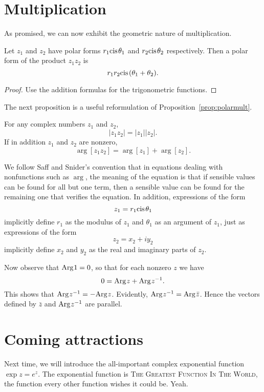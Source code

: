 \documentclass[twocolumn,12pt]{article}
\begin{document}
\section{Multiplication}
As promised, we can now exhibit the geometric nature of multiplication.
\begin{proposition} \label{prop:polarmult}
  Let $z_1$ and $z_2$ have polar forms $r_1 \cis{\theta_1}$ and $r_2 \cis{\theta_2}$ respectively. Then a polar form of the product $z_1 z_2$ is
  \[
    r_1 r_2 \cis{(\theta_1 + \theta_2)}.
  \]
\end{proposition}
\begin{proof}
  Use the addition formulas for the trigonometric functions.
\end{proof}
The next proposition is a useful reformulation of Proposition~\ref{prop:polarmult}. 
\begin{proposition}
  For any complex numbers $z_1$ and $z_2$,
  \[
    |z_1 z_2| = |z_1| |z_2|.
  \]
  If in addition $z_1$ and $z_2$ are nonzero,
  \[
    \arg[z_1 z_2] = \arg[z_1] + \arg[z_2].
  \]
\end{proposition}
We follow Saff and Snider's convention that in equations dealing with nonfunctions such as $\arg$, the meaning of the equation is that if sensible values can be found for all but one term, then a sensible value can be found for the remaining one that verifies the equation. In addition, expressions of the form
\[
  z_1 = r_1 \cis{\theta_1}
\]
implicitly define $r_1$ as the modulus of $z_1$ and $\theta_1$ as an argument of $z_1$, just as expressions of the form
\[
  z_2 = x_2 + i y_2
\]
implicitly define $x_2$ and $y_2$ as the real and imaginary parts of $z_2$.

Now observe that $\Arg[1] = 0$, so that for each nonzero $z$ we have
\[
  0 = \Arg[z] + \Arg[z^{-1}].
\]
This shows that $\Arg[z^{-1}] = -\Arg[z]$. Evidently, $\Arg[z^{-1}] = \Arg[\bar{z}]$. Hence the vectors defined by $\bar{z}$ and $\Arg[z^{-1}]$ are parallel.
\section{Coming attractions}
Next time, we will introduce the all-important complex exponential function $\exp{z} = e^z$. The exponential function is \textsc{The Greatest Function In The World}, the function every other function wishes it could be. Yeah.
\end{document}
